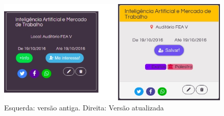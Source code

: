         \begin{figure}[htb]
        \centering
		\includegraphics[width=15cm]{figuras/thumbs_comparison_v1_v2}
		\caption{\label{fig:thumbs_comparison_v1_v2} Esquerda: versão antiga. Direita: Versão atualizada}
		\end{figure}


